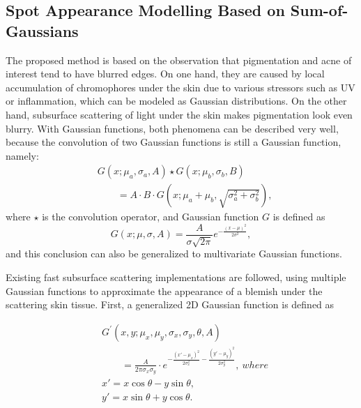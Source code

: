 \begin{spacing}{1.5}
\section{Spot Appearance Modelling Based on Sum-of-Gaussians}
The proposed method is based on the observation that pigmentation and acne of interest tend to have blurred edges. On one hand, they are caused by local accumulation of chromophores under the skin due to various stressors such as UV or inflammation, which can be modeled as Gaussian distributions. On the other hand, subsurface scattering of light under the skin makes pigmentation look even blurry. With Gaussian functions, both phenomena can be described very well, because the convolution of two Gaussian functions is still a Gaussian function, namely:
\begin{equation}
    \begin{aligned}
         & G(x; \mu_a, \sigma_a, A)\star G(x; \mu_b, \sigma_b, B)                 \\
         & \qquad= A\cdot B\cdot G(x; \mu_a+\mu_b, \sqrt{\sigma_a^2+\sigma_b^2}),
    \end{aligned}
\end{equation}
where $\star$ is the convolution operator, and Gaussian function $G$ is defined as
\begin{equation}
    G(x; \mu, \sigma, A) = \frac{A}{\sigma\sqrt{2\pi}}e^{-\frac{{(x - \mu)^2}}{{2\sigma^2}}},
\end{equation}
and this conclusion can also be generalized to multivariate Gaussian functions.

Existing fast subsurface scattering implementations are followed, using multiple Gaussian functions to approximate the appearance of a blemish under the scattering skin tissue. First, a generalized 2D Gaussian function is defined as

\begin{equation}
    \begin{aligned}
         & G^\prime(x, y; \mu_x, \mu_y, \sigma_x, \sigma_y, \theta, A)                                                                                 \\
         & \qquad=\frac{A}{2\pi \sigma_x \sigma_y}\cdot e^{-\frac{{(x' - \mu_x)^2}}{{2 \sigma_x^2}} - \frac{{(y' - \mu_y)^2}}{{2 \sigma_y^2}}},\ where \\
         & x' = x \cos\theta - y \sin\theta,                                                                                                           \\
         & y' = x \sin\theta + y \cos\theta.
    \end{aligned}
\end{equation}


\end{spacing}
